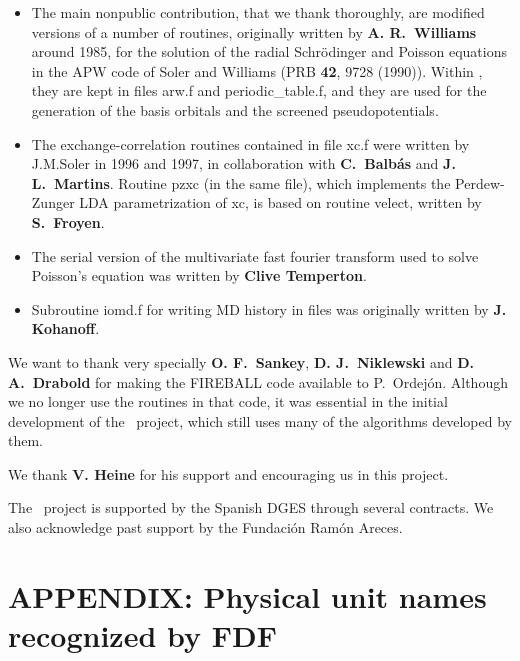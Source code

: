\begin{itemize}
  \item%
  The main nonpublic contribution, that we thank thoroughly, are
  modified versions of a number of routines, originally written by
  \textbf{A. R.\ Williams} around 1985, for the solution of the radial
  Schr\"odinger and Poisson equations in the APW code of Soler and
  Williams (PRB \textbf{42}, 9728 (1990)).  Within \siesta, they are
  kept in files arw.f and periodic\_table.f, and they are used for the
  generation of the basis orbitals and the screened pseudopotentials.

  \item%
  The exchange-correlation routines contained in file xc.f were
  written by J.M.Soler in 1996 and 1997, in collaboration with
  \textbf{C.\ Balb\'as} and \textbf{J. L.\ Martins}.  Routine pzxc (in
  the same file), which implements the Perdew-Zunger LDA
  parametrization of xc, is based on routine velect, written by
  \textbf{S.\ Froyen}.

  \item%
  The serial version of the multivariate fast fourier transform used
  to solve Poisson's equation was written by \textbf{Clive Temperton}.

  \item%
  Subroutine iomd.f for writing MD history in files was originally
  written by \textbf{J. Kohanoff}.

\end{itemize}

We want to thank very specially \textbf{O. F.\ Sankey}, \textbf{D. J.\
    Niklewski} and \textbf{D. A.\ Drabold} for making the FIREBALL
code available to P.\ Ordej\'on.  Although we no longer use the
routines in that code, it was essential in the initial development of
the \siesta\ project, which still uses many of the algorithms
developed by them.

We thank \textbf{V. Heine} for his support and encouraging us in this
project.

The \siesta\ project is supported by the Spanish DGES through
several contracts. We also acknowledge past support by the Fundaci\'on
Ram\'on Areces.



\section{APPENDIX: Physical unit names recognized by FDF}
\label{sec:fdf-units}

